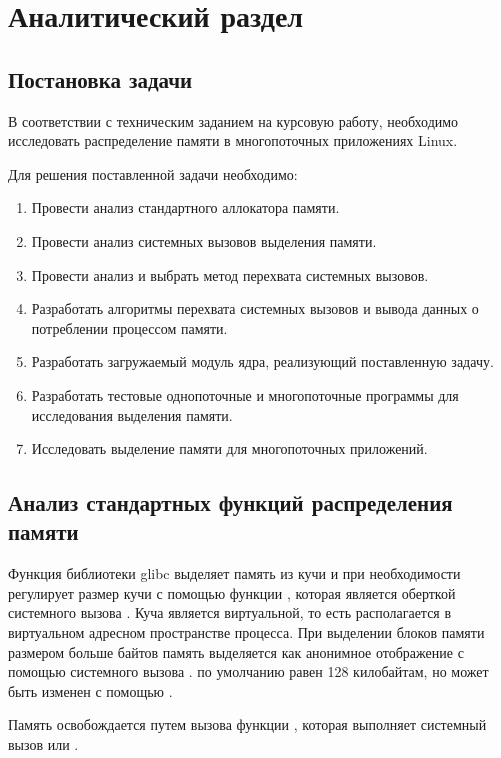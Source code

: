 \chapter{Аналитический раздел}

\section{Постановка задачи}

В соответствии с техническим заданием на курсовую работу, необходимо исследовать распределение памяти в многопоточных приложениях Linux. 

Для решения поставленной задачи необходимо:
\begin{enumerate}
	\item Провести анализ стандартного аллокатора памяти.
	\item Провести анализ системных вызовов выделения памяти.
	\item Провести анализ и выбрать метод перехвата системных вызовов.
	\item Разработать алгоритмы перехвата системных вызовов и вывода данных о потреблении процессом памяти.
	\item Разработать загружаемый модуль ядра, реализующий поставленную задачу.
	\item Разработать тестовые однопоточные и многопоточные программы для исследования выделения памяти.
	\item Исследовать выделение памяти для многопоточных приложений.
\end{enumerate}

\section{Анализ стандартных функций распределения памяти}

Функция  библиотеки glibc выделяет память из кучи и при необходимости регулирует размер кучи с помощью функции , которая является оберткой системного вызова . Куча является виртуальной, то есть располагается в виртуальном адресном пространстве процесса. При выделении блоков памяти размером больше  байтов память выделяется как анонимное отображение с помощью системного вызова .  по умолчанию равен 128 килобайтам, но может быть изменен с помощью .

Память освобождается путем вызова функции , которая выполняет системный вызов  или .

